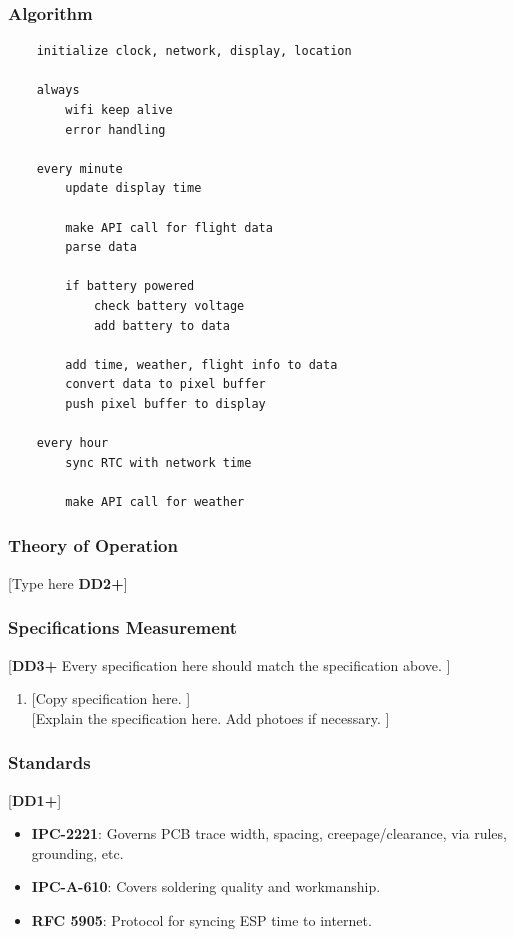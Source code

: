 \subsubsection{Algorithm}
\begin{lstlisting}
    initialize clock, network, display, location

    always 
        wifi keep alive
        error handling
    
    every minute
        update display time

        make API call for flight data
        parse data

        if battery powered
            check battery voltage
            add battery to data

        add time, weather, flight info to data
        convert data to pixel buffer
        push pixel buffer to display
    
    every hour
        sync RTC with network time

        make API call for weather

\end{lstlisting}

\subsubsection{Theory of Operation}
[Type here \textbf{DD2+}]

\subsubsection{Specifications Measurement}
[\textbf{DD3+} Every specification here should match the specification above. ]
\begin{enumerate}
    \item {[Copy specification here. ]} \\
          {[Explain the specification here. Add photoes if necessary. ]}
\end{enumerate}

\subsubsection{Standards}
[\textbf{DD1+}]
\begin{itemize}
    \item \textbf{IPC-2221}: Governs PCB trace width, spacing, creepage/clearance, via rules, grounding, etc.
    \item \textbf{IPC-A-610}: Covers soldering quality and workmanship.
    \item \textbf{RFC 5905}: Protocol for syncing ESP time to internet.
\end{itemize}
